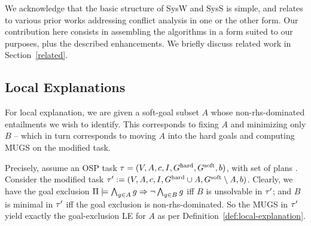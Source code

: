 %

We acknowledge that the basic structure of SysW and SysS is simple,
and relates to various prior works addressing conflict analysis in one
or the other form. Our contribution here consists in assembling the
algorithms in a form suited to our purposes, plus the described
enhancements. We briefly discuss related work in
Section~\ref{related}.






\subsection{Local Explanations}
\label{algorithms:le}

For local explanation, we are given a soft-goal subset $A$ whose
non-rhs-dominated entailments we wish to identify. This corresponds to
fixing $A$ and minimizing only $B$ -- which in turn corresponds to
moving $A$ into the hard goals and computing MUGS on the modified
task.

Precisely, assume an OSP task $\tau =
(V,\allowbreak A,\allowbreak{\ensuremath{c}},\allowbreak I,\allowbreak G^{\text{\textup{hard}}},\allowbreak G^{\text{\textup{soft}}},\allowbreak{\ensuremath{b}})$,
with set of plans \plans. Consider the modified task $\tau' :=
(V,\allowbreak A,\allowbreak{\ensuremath{c}},\allowbreak I,\allowbreak G^{\text{\textup{hard}}}
\cup A,\allowbreak G^{\text{\textup{soft}}} \setminus
A,\allowbreak{\ensuremath{b}})$. Clearly, we have the goal exclusion
$\Pi \models \bigwedge_{g \in A} g \Rightarrow \neg \bigwedge_{g \in B} g$
iff $B$ is unsolvable in $\tau'$; and $B$ is minimal in $\tau'$ iff
the goal exclusion is non-rhs-dominated. So the MUGS in $\tau'$ yield
exactly the goal-exclusion LE for $A$ as per
Definition~\ref{def:local-explanation}.

